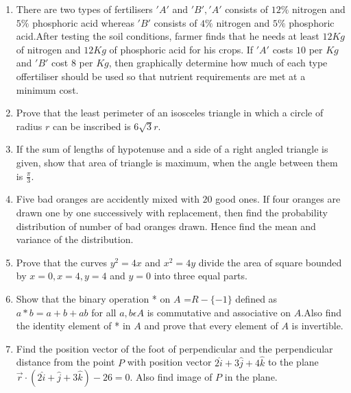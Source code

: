 \documentclass[12pt,-letter paper]{article}
\providecommand{\brak}[1]{\ensuremath{\left(#1\right)}}
\begin{document}
\begin{enumerate}
\item There are two types of fertilisers $'A'$ and $'B', 'A'$ consists of $12\%$ nitrogen and$5\%$ phosphoric acid whereas $'B'$ consists of $4\%$ nitrogen and $5\%$ phosphoric acid.After testing the soil conditions, farmer finds that he needs at least $12 Kg$ of nitrogen and $12 Kg$ of phosphoric acid for his crops. If $'A'$ costs \rupee$10$ per $Kg$ and $'B'$ cost \rupee$8$ per $Kg$, then graphically determine how much of each type offertiliser should be used so that nutrient requirements are met at a minimum cost.
\item Prove that the least perimeter of an isosceles triangle in which a circle of radius $r$ can be inscribed is $6\sqrt{3}r$.
\item If the sum of lengths of hypotenuse and a side of a right angled triangle is given, show that area of triangle is maximum, when the angle between them is $\frac{\pi}{3}$.
\item Five bad oranges are accidently mixed with $20$ good ones. If four oranges are drawn one by one successively with replacement, then find the probability distribution of number of bad oranges drawn. Hence find the mean and variance of the distribution.
\item Prove that the curves $y^2=4x$ and $x^2=4y$ divide the area of square bounded by $x=0 ,x=4,y=4$ and $y=0$ into three equal parts.
\item Show that the binary operation * on $A$ =$ R -\{-1\}$ defined as $a*b=a+b+ab$ for all  $a,b \epsilon A$ is commutative and associative on $A$.Also find the identity element of * in $A$ and prove that every element of $A$ is invertible.
\item Find the position vector of the foot of perpendicular and the perpendicular distance from the point $P$ with position vector $2\hat{i}+3\hat{j}+4\hat{k}$ to the plane $\overset{\rightarrow}{r} \cdot\brak{2\hat{i}+\hat{j}+3\hat{k}}-26 = 0$. Also find image of $P$ in the plane.





\end{enumerate} 
\end{document}
